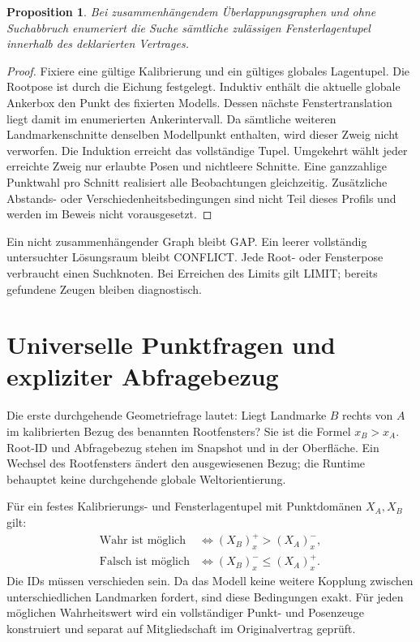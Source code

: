 \documentclass[11pt,a4paper]{article}
\newcommand{\nextsection}[2]{\clearpage{\color{accent}\small\textsf{#1}}\section{#2}}
\newtheorem{proposition}{Proposition}[section]
\begin{document}
\begin{proposition}
Bei zusammenhängendem Überlappungsgraphen und ohne Suchabbruch
enumeriert die Suche sämtliche zulässigen Fensterlagentupel
innerhalb des deklarierten Vertrages.
\end{proposition}
\begin{proof}
Fixiere eine gültige Kalibrierung und ein gültiges globales
Lagentupel. Die Rootpose ist durch die Eichung festgelegt.
Induktiv enthält die aktuelle globale Ankerbox den Punkt des
fixierten Modells. Dessen nächste Fenstertranslation liegt damit
im enumerierten Ankerintervall. Da sämtliche weiteren
Landmarkenschnitte denselben Modellpunkt enthalten, wird dieser
Zweig nicht verworfen. Die Induktion erreicht das vollständige
Tupel. Umgekehrt wählt jeder erreichte Zweig nur erlaubte Posen
und nichtleere Schnitte. Eine ganzzahlige Punktwahl pro Schnitt
realisiert alle Beobachtungen gleichzeitig. Zusätzliche
Abstands- oder Verschiedenheitsbedingungen sind nicht Teil
dieses Profils und werden im Beweis nicht vorausgesetzt.
\end{proof}

Ein nicht zusammenhängender Graph bleibt GAP. Ein leerer
vollständig untersuchter Lösungsraum bleibt CONFLICT. Jede Root-
oder Fensterpose verbraucht einen Suchknoten. Bei Erreichen des
Limits gilt LIMIT; bereits gefundene Zeugen bleiben diagnostisch.

\nextsection{68 / ANTWORTFREIGABE}{Universelle Punktfragen und expliziter Abfragebezug}
Die erste durchgehende Geometriefrage lautet: Liegt Landmarke
$B$ rechts von $A$ im kalibrierten Bezug des benannten Rootfensters?
Sie ist die Formel $x_B>x_A$. Root-ID und Abfragebezug stehen im
Snapshot und in der Oberfläche. Ein Wechsel des Rootfensters
ändert den ausgewiesenen Bezug; die Runtime behauptet keine
durchgehende globale Weltorientierung.

Für ein festes Kalibrierungs- und Fensterlagentupel mit
Punktdomänen $X_A,X_B$ gilt:
\begin{align*}
\text{Wahr ist möglich}&\iff (X_B)^+_x>(X_A)^-_x,\\
\text{Falsch ist möglich}&\iff (X_B)^-_x\le (X_A)^+_x.
\end{align*}
Die IDs müssen verschieden sein. Da das Modell keine weitere
Kopplung zwischen unterschiedlichen Landmarken fordert, sind
diese Bedingungen exakt. Für jeden möglichen Wahrheitswert wird
ein vollständiger Punkt- und Posenzeuge konstruiert und separat
auf Mitgliedschaft im Originalvertrag geprüft.
\end{document}
